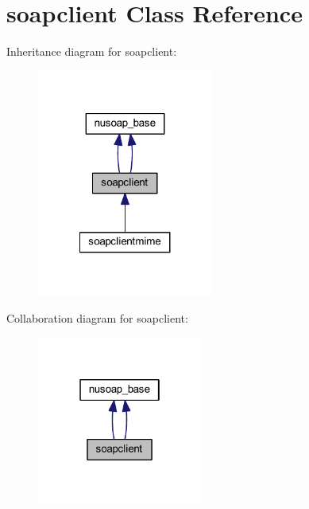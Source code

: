 \hypertarget{classsoapclient}{\section{soapclient Class Reference}
\label{classsoapclient}
}


Inheritance diagram for soapclient\-:
\nopagebreak
\begin{figure}[H]
\begin{center}
\leavevmode
\includegraphics[width=164pt]{classsoapclient__inherit__graph}
\end{center}
\end{figure}


Collaboration diagram for soapclient\-:
\nopagebreak
\begin{figure}[H]
\begin{center}
\leavevmode
\includegraphics[width=154pt]{classsoapclient__coll__graph}
\end{center}
\end{figure}
